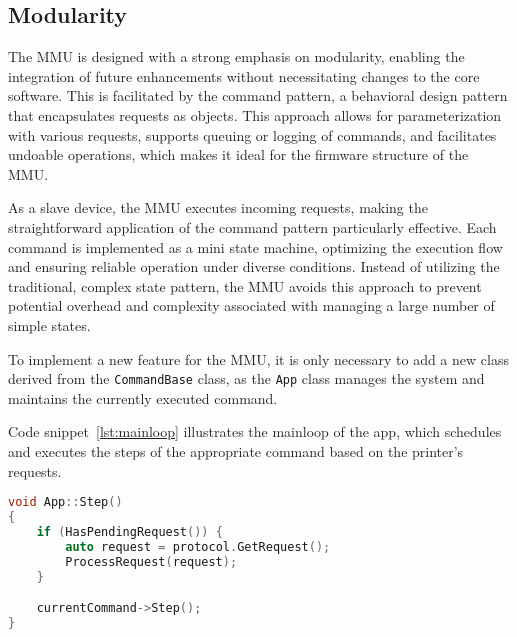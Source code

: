 \subsection{Modularity}

The MMU is designed with a strong emphasis on modularity, enabling the integration of future enhancements without necessitating changes to the core software. This is facilitated by the command pattern, a behavioral design pattern that encapsulates requests as objects. This approach allows for parameterization with various requests, supports queuing or logging of commands, and facilitates undoable operations, which makes it ideal for the firmware structure of the MMU.

As a slave device, the MMU executes incoming requests, making the straightforward application of the command pattern particularly effective. Each command is implemented as a mini state machine, optimizing the execution flow and ensuring reliable operation under diverse conditions. Instead of utilizing the traditional, complex state pattern, the MMU avoids this approach to prevent potential overhead and complexity associated with managing a large number of simple states.

To implement a new feature for the MMU, it is only necessary to add a new class derived from the \texttt{CommandBase} class, as the \texttt{App} class manages the system and maintains the currently executed command.

Code snippet~\ref{lst:mainloop} illustrates the mainloop of the app, which schedules and executes the steps of the appropriate command based on the printer's requests.

\begin{lstlisting}[language=c++, caption={App mainloop},label={lst:mainloop},basicstyle=\ttfamily\small]
void App::Step()
{
    if (HasPendingRequest()) {
        auto request = protocol.GetRequest();
        ProcessRequest(request);
    }

    currentCommand->Step();
}
\end{lstlisting}
